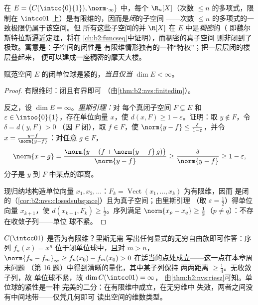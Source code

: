 \begin{example}[闭子空间与稠密子空间]\label{ex:b2:nvs:closeddense}
在 $E = \bigl(C(\intcc{0}{1}), \norm\cdot_\infty\bigr)$ 中，每个
$\R_n[X]$（次数 $\leq n$ 的多项式，限制在
$\intcc01$ 上）是有限维的，因而是\emph{闭}的子空间
——次数 $\leq n$ 的多项式的一致极限仍属于该空间。但
所有这些子空间的并 $\R[X]$ 在 $E$ 中是\emph{稠密}的（
即魏尔斯特拉斯逼近定理，将在
\cref{ch:b2:funcseq}中证明），而稠密的真子空间
则非闭到了极致。寓意是：子空间的闭性是
有限维情形独有的一种“特权”；把一层层闭的楼层叠起来，
便可以建成一座稠密的摩天大楼。
\end{example}

\begin{theorem}[里斯]\label{thm:b2:nvs:riesz}
赋范空间 $E$ 的闭单位球是紧的，\emph{当且仅当
}$\dim E < \infty$。
\end{theorem}

\begin{proof}
有限维时：闭且有界即可
（由\cref{thm:b2:nvs:finitedim}）。

反之，设 $\dim E = \infty$。\emph{里斯引理：}对
每个真闭子空间 $F \subsetneq E$ 和 $\varepsilon \in
\intoo{0}{1}$，存在单位向量 $x$，使 $d(x, F) \geq 1 -
\varepsilon$。证明：取 $y \notin F$，令 $\delta = d(y, F) > 0$
（因 $F$ 闭），取 $f \in F$，使 $\norm{y - f} \leq
\frac{\delta}{1 - \varepsilon}$，并令 $x = \frac{y - f}{\norm{y -
f}}$：对任意 $g \in F$，
\[
\norm{x - g} = \frac{\norm{y - (f + \norm{y-f}\,g)}}{\norm{y - f}}
\geq \frac{\delta}{\norm{y-f}} \geq 1 - \varepsilon ,
\]
分子是 $y$ 到 $F$ 中某点的距离。

现归纳地构造单位向量 $x_1, x_2, \dots$：$F_k =
\operatorname{Vect}(x_1, \dots, x_k)$ 为有限维，因而
是闭的（\cref{cor:b2:nvs:closedsubspace}）且为真子空间；由里斯引理
（取 $\varepsilon = \frac12$）得单位向量 $x_{k+1}$，使 $d(x_{k+1},
F_k) \geq \frac12$。序列满足 $\norm{x_p - x_q} \geq
\frac12$（$p \neq q$）：不存在收敛子列——单位
球不紧。
\end{proof}

\begin{example}[里斯作为维数探测器]\label{ex:b2:nvs:rieszdetector}
$C(\intcc01)$ 是否为有限维？里斯无需
写出任何显式的无穷自由族即可作答：序列
$f_n(x) = x^n$ 位于闭单位球中，且对
$m > n$，$\norm{f_n - f_m}_\infty \geq f_n(x_0) - f_m(x_0) > 0$
在适当的点处成立——这一点在本章周末问题
（第 16 题）中得到清晰的量化，其中某子列保持
两两距离 $\geq \frac14$。无收敛子列，故
单位球不紧，故 $\dim C(\intcc01) = \infty$，
由\cref{thm:b2:nvs:riesz}可知。单位球的紧性是一种
完美的二分：在有限维中成立，在无穷维中
失效，两者之间没有中间地带——仅凭几何即可
读出空间的维数类型。
\end{example}

